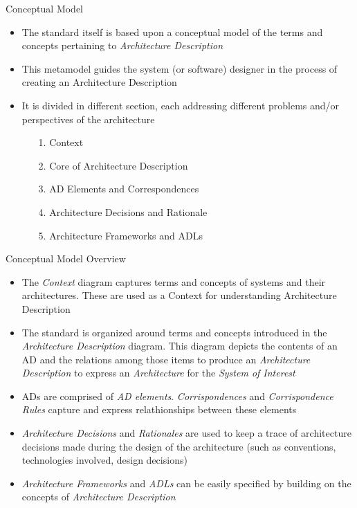 		\begin{frame}
			\begin{block}{Conceptual Model}
			\vspace{0.2cm}
				\begin{itemize}
				\item The standard itself is based upon a conceptual model of the terms and concepts pertaining to \emph{Architecture Description}
				\item This metamodel guides the system (or software) designer in the process of creating an Architecture Description
				\item It is divided in different section, each addressing different problems and/or perspectives of the architecture
					\begin{itemize}
						\item[1.] Context
						\item[2.] Core of Architecture Description
						\item[3.] AD Elements and Correspondences
						\item[4.] Architecture Decisions and Rationale
						\item[5.] Architecture Frameworks and ADLs
					\end{itemize}
				\end{itemize}
				\vspace{0.2cm}
			\end{block}
		\end{frame}
		
		\begin{frame}
			\begin{block}{Conceptual Model Overview}
				\begin{itemize}
					\item The \emph{Context} diagram captures terms and concepts of systems and their architectures. These are used as a Context for understanding Architecture Description
					\item The standard is organized around terms and concepts introduced in the\emph{ Architecture Description} diagram. This diagram depicts the contents of an AD and the relations among those items to produce an \emph{Architecture Description} to express an \emph{Architecture} for the \emph{System of Interest}
					\item ADs are comprised of \emph{AD elements}. \emph{Corrispondences} and \emph{Corrispondence Rules} capture and express relathionships between these elements
					\item \emph{Architecture Decisions} and \emph{Rationales} are used to keep a trace of architecture decisions made during the design of the architecture (such as conventions, technologies involved, design decisions)
					\item \emph{Architecture Frameworks} and \emph{ADLs} can be easily specified by building on the concepts of \emph{Architecture Description}
				\end{itemize}
			\end{block}
		\end{frame}
		

